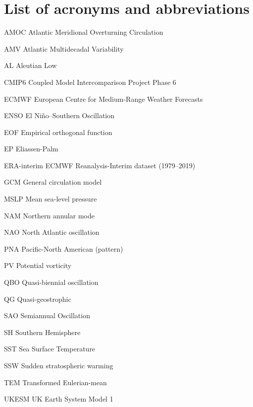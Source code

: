 \chapter*{List of acronyms and abbreviations}

\begin{description*}

\item[AMOC] Atlantic Meridional Overturning Circulation
\item[AMV] Atlantic Multidecadal Variability
\item[AL] Aleutian Low
\item[CMIP6] Coupled Model Intercomparison Project Phase 6
\item[ECMWF] European Centre for Medium-Range Weather Forecasts
\item[ENSO] El Ni\~no--Southern Oscillation
\item[EOF] Empirical orthogonal function
\item[EP] Eliassen-Palm
\item[ERA-interim] ECMWF Reanalysis-Interim dataset (1979--2019)
\item[GCM] General circulation model
\item[MSLP] Mean sea-level pressure
\item[NAM] Northern annular mode
\item[NAO] North Atlantic oscillation
\item[PNA] Pacific-North American (pattern)
\item[PV] Potential vorticity
\item[QBO] Quasi-biennial oscillation
\item[QG] Quasi-geostrophic
\item[SAO] Semiannual Oscillation
\item[SH] Southern Hemisphere
\item[SST] Sea Surface Temperature
\item[SSW] Sudden stratospheric warming
\item[TEM] Transformed Eulerian-mean
\item[UKESM] UK Earth System Model 1



\end{description*}



